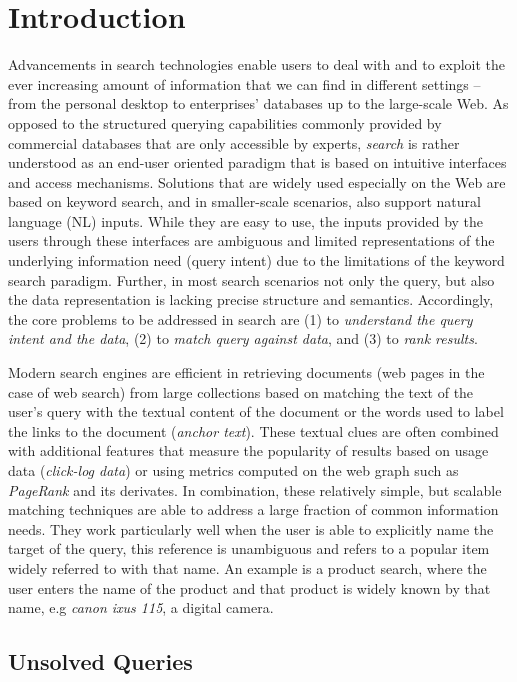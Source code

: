 \section{Introduction}
Advancements in search technologies enable users to deal with and to exploit the ever increasing amount of information that we can find in different settings -- from the personal desktop to enterprises' databases up to the large-scale Web. As opposed to the structured querying capabilities commonly provided by commercial databases that are only accessible by experts, \emph{search} is rather understood as an end-user oriented paradigm that is based on intuitive interfaces and access mechanisms. Solutions that are widely used especially on the Web are based on keyword search, and in smaller-scale scenarios, also support natural language (NL) inputs. While they are easy to use, the inputs provided by the users through these interfaces are ambiguous and limited representations of the underlying information need (query intent) due to the limitations of the keyword search paradigm. Further, in most search scenarios not only the query, but also the data representation is lacking precise structure and semantics. Accordingly, the core problems to be addressed in search are (1) to \emph{understand the query intent and the data}, (2) to \emph{match query against data}, and (3) to \emph{rank results}. 

Modern search engines are efficient in retrieving documents (web pages in the case of web search) from large collections based on matching the text of the user's query with the textual content of the document or the words used to label the links to the document (\emph{anchor text}). These textual clues are often combined with additional features that measure the popularity of results based on usage data (\emph{click-log data}) or using metrics computed on the web graph such as \emph{PageRank} and its derivates. In combination, these relatively simple, but scalable matching techniques are able to address a large fraction of common information needs. They work particularly well when the user is able to explicitly name the target of the query, this reference is unambiguous and refers to a popular item widely referred to with that name. An example is a product search, where the user enters the name of the product and that product is widely known by that name, e.g \emph{canon ixus 115}, a digital camera.


\subsection{Unsolved Queries}

